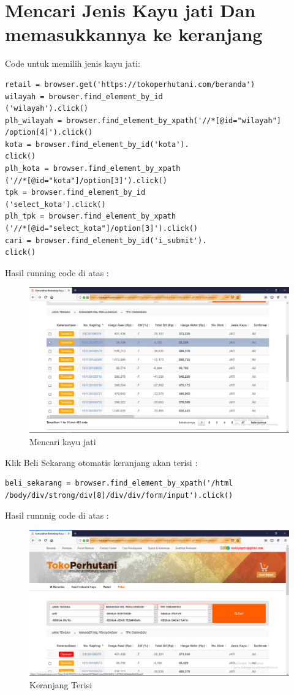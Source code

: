 \section{Mencari Jenis Kayu jati Dan memasukkannya ke keranjang}
Code untuk memilih jenis kayu jati:
\begin{verbatim}
retail = browser.get('https://tokoperhutani.com/beranda')
wilayah = browser.find_element_by_id
('wilayah').click()
plh_wilayah = browser.find_element_by_xpath('//*[@id="wilayah"]
/option[4]').click()
kota = browser.find_element_by_id('kota').
click()
plh_kota = browser.find_element_by_xpath
('//*[@id="kota"]/option[3]').click()
tpk = browser.find_element_by_id
('select_kota').click()
plh_tpk = browser.find_element_by_xpath
('//*[@id="select_kota"]/option[3]').click()
cari = browser.find_element_by_id('i_submit').
click()
\end{verbatim}
Hasil running code di atas :
\begin{figure}[h]
	\centering
	\includegraphics[scale=0.20]{figures/51}
	\caption{Mencari kayu jati}
\end{figure}

\newpage
Klik Beli Sekarang otomatis keranjang akan terisi :
\begin{verbatim}
beli_sekarang = browser.find_element_by_xpath('/html
/body/div/strong/div[8]/div/div/form/input').click()
\end{verbatim}
Hasil runnnig code di atas :
\begin{figure}[h]
	\centering
	\includegraphics[scale=0.20]{figures/52}
	\caption{Keranjang Terisi}
\end{figure}

